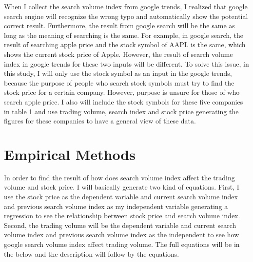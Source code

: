 \documentclass[12pt,english]{article}
\begin{document}
\newline
When I collect the search volume index from google trends, I realized that google search engine will recognize the wrong typo and automatically show the potential correct result. Furthermore, the result from google search will be the same as long as the meaning of searching is the same. For example, in google search, the result of searching apple price and the stock symbol of AAPL is the same, which shows the current stock price of Apple. However, the result of search volume index in google trends for these two inputs will be different. To solve this issue, in this study, I will only use the stock symbol as an input in the google trends, because the purpose of people who search stock symbols must try to find the stock price for a certain company. However, purpose is unsure for those of who search apple price. I also will include the stock symbols for these five companies in table 1 and use trading volume, search index and stock price generating the figures for these companies to have a general view of these data.
\newline


\section{Empirical Methods}
In order to find the result of  how does search volume index affect the trading volume and stock price. I will basically generate two kind of equations. First, I use the stock price as the dependent variable and current search volume index and previous search volume index as my independent variable generating a regression to see the relationship between stock price and search volume index. Second, the trading volume will be the dependent variable and current search volume index and previous search volume index as the independent to see how google search volume index affect trading volume. The full equations will be in the below and the description will follow by the equations.
\end{document}
